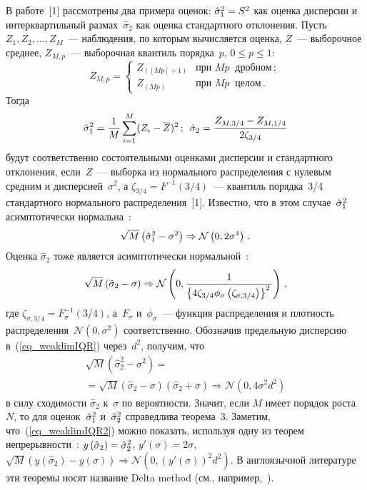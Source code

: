 \begin{multicols}{2}
В работе~[1] рассмотрены два примера оценок: 
$\hat\sigma^2_1=S^2$ как оценка дисперсии и интерквартильный размах~$\hat\sigma_2$ как оценка стандартного отклонения. 
Пусть $Z_1, Z_2, \ldots, Z_M$~--- наблюдения, по которым вычисляется оценка, $\overline{Z}$~--- выборочное среднее, 
$Z_{M,p}$~--- выборочная квантиль порядка~$p$, $0\leq p\leq 1$:
\begin{equation*}
Z_{M,p}=
\begin{cases}
Z_{\left([Mp]+1\right)} & \text{при } Mp~\text{ дробном}\,;\\
Z_{\left(Mp\right)} & \text{при } Mp~\text{ целом}\,.
\end{cases}
\end{equation*}
Тогда
\begin{equation*}
\hat\sigma^2_1=\displaystyle\frac{\displaystyle 1\mathstrut}{\displaystyle M\mathstrut}\sum_{i=1}^M(Z_i-\overline{Z})^2\,;\enskip
\hat\sigma_2=\displaystyle\frac{\displaystyle Z_{M,3/4}-Z_{M,1/4}\mathstrut}{\displaystyle 2\zeta_{3/4}\mathstrut}
\end{equation*}
будут соответственно состоятельными оценками дисперсии и стандартного отклонения, 
если~$Z$~--- выборка из нормального распределения с нулевым средним и дисперсией~$\sigma^2$, а 
$\zeta_{3/4}=F^{-1}\left(3/4\right)$~--- квантиль порядка~3/4 стандартного 
нормального распределения~[1]. Известно, что в этом случае~$\hat\sigma^2_1$ асимптотически нормальна~\cite{8mar}:
\begin{equation*}
\sqrt{M}\left(\hat\sigma^2_1-\sigma^2\right)\Rightarrow\mathcal{N}\left(0,2\sigma^4\right)\,.
\end{equation*}
Оценка $\hat\sigma_2$ тоже является асимптотически нормальной~\cite{9mar}:
\begin{equation}
\label{eq_weaklimIQR}
\sqrt{M}\left(\hat\sigma_2-\sigma\right)\Rightarrow\mathcal{N}\left(0,\displaystyle\frac{\displaystyle 1\mathstrut}{\displaystyle \left\{4\zeta_{3/4}\phi_\sigma
\left(\zeta_{\sigma,3/4}\right)\right\}^2\mathstrut}\right)\,,
\end{equation}
где $\zeta_{\sigma,3/4}=F_\sigma^{-1}\left(3/4\right)$, а~$F_\sigma$ и~$\phi_\sigma$~--- 
функция распределения и плотность распределения~$\mathcal{N}\left(0,\sigma^2\right)$ соответственно. 
Обозначив предельную дисперсию в~(\ref{eq_weaklimIQR}) через~$d^2$, получим, что
\begin{multline}
\label{eq_weaklimIQR2}
\sqrt{M}\left(\hat\sigma_2^2-\sigma^2\right)={}\\
{}=\sqrt{M}\left(\hat\sigma_2-\sigma\right)\left(\hat\sigma_2+\sigma\right)\Rightarrow\mathcal{N}\left(0,4\sigma^2d^2\right)
\end{multline}
в силу сходимости $\hat\sigma_2$ к~$\sigma$ по вероятности. Значит, если $M$ имеет порядок роста~$N$, 
то для оценок~$\hat\sigma^2_1$ и~$\hat\sigma^2_2$ справедлива теорема~3. 
Заметим, что~(\ref{eq_weaklimIQR2}) можно показать, используя одну из теорем непрерывности~\cite{8mar}: 
$y\left(\hat\sigma_2\right)=\hat\sigma^2_2$, $y'(\sigma)=2\sigma$, 
$\sqrt{M}\left(y(\hat\sigma_2)-y(\sigma)\right)\Rightarrow\mathcal{N}\left(0,\left(y'(\sigma)\right)^2d^2\right)$. 
В англоязычной литературе эти теоремы носят название Delta method (см., например,~\cite{10mar}).


\end{multicols}
